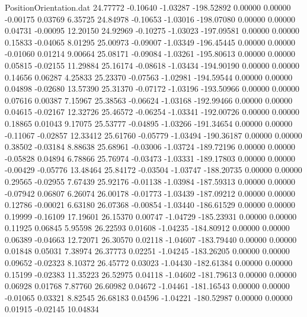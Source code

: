 \begin{filecontents}{PositionOrientation.dat}
  24.77772   -0.10640   -1.03287  -198.52892    0.00000    0.00000   -0.00175    0.03769    6.35725
  24.84978   -0.10653   -1.03016  -198.07080    0.00000    0.00000    0.04731   -0.00095   12.20150
  24.92969   -0.10275   -1.03023  -197.09581    0.00000    0.00000    0.15833   -0.04065    8.01295
  25.00973   -0.09007   -1.03349  -196.45445    0.00000    0.00000   -0.01060    0.01214    9.00664
  25.08171   -0.09084   -1.03261  -195.80613    0.00000    0.00000    0.05815   -0.02155   11.29884
  25.16174   -0.08618   -1.03434  -194.90190    0.00000    0.00000    0.14656    0.06287    4.25833
  25.23370   -0.07563   -1.02981  -194.59544    0.00000    0.00000    0.04898   -0.02680   13.57390
  25.31370   -0.07172   -1.03196  -193.50966    0.00000    0.00000    0.07616    0.00387    7.15967
  25.38563   -0.06624   -1.03168  -192.99466    0.00000    0.00000    0.04615   -0.02167   12.32726
  25.46572   -0.06254   -1.03341  -192.00726    0.00000    0.00000    0.18865    0.01043    9.17075
  25.53777   -0.04895   -1.03266  -191.34654    0.00000    0.00000   -0.11067   -0.02857   12.33412
  25.61760   -0.05779   -1.03494  -190.36187    0.00000    0.00000    0.38502   -0.03184    8.88638
  25.68961   -0.03006   -1.03724  -189.72196    0.00000    0.00000   -0.05828    0.04894    6.78866
  25.76974   -0.03473   -1.03331  -189.17803    0.00000    0.00000   -0.00429   -0.05776   13.48464
  25.84172   -0.03504   -1.03747  -188.20735    0.00000    0.00000    0.29565   -0.02955    7.67439
  25.92176   -0.01138   -1.03984  -187.59313    0.00000    0.00000   -0.07942    0.06807    6.26074
  26.00178   -0.01773   -1.03439  -187.09212    0.00000    0.00000    0.12786   -0.00021    6.63180
  26.07368   -0.00854   -1.03440  -186.61529    0.00000    0.00000    0.19999   -0.16109   17.19601
  26.15370    0.00747   -1.04729  -185.23931    0.00000    0.00000    0.11925    0.06845    5.95598
  26.22593    0.01608   -1.04235  -184.80912    0.00000    0.00000    0.06389   -0.04663   12.72071
  26.30570    0.02118   -1.04607  -183.79440    0.00000    0.00000    0.01848    0.05031    7.38974
  26.37773    0.02251   -1.04245  -183.26205    0.00000    0.00000    0.09652   -0.02323    8.10372
  26.45772    0.03023   -1.04430  -182.61384    0.00000    0.00000    0.15199   -0.02383   11.35223
  26.52975    0.04118   -1.04602  -181.79613    0.00000    0.00000    0.06928    0.01768    7.87760
  26.60982    0.04672   -1.04461  -181.16543    0.00000    0.00000   -0.01065    0.03321    8.82545
  26.68183    0.04596   -1.04221  -180.52987    0.00000    0.00000    0.01915   -0.02145   10.04834

\end{filecontents}
